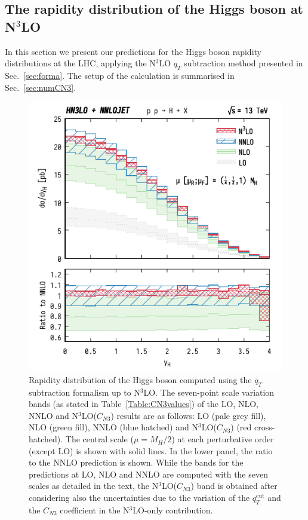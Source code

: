 \documentclass[12pt]{article}
\DeclareRobustCommand{\qt}{q_T}
\DeclareRobustCommand{\qtcut}{\ensuremath{q_T^\mathrm{cut}}}
\begin{document}
\subsection{The rapidity distribution of the Higgs boson at \texorpdfstring{N${}^\text{3}$LO}{N3LO}}
\label{sec:results}

In this section we present our predictions for the Higgs boson rapidity distributions at the LHC, applying the N$^{3}$LO $\qt$ subtraction method presented in Sec.~\ref{sec:forma}. The setup of the calculation is summarised in Sec.~\ref{sec:numCN3}. 

\begin{figure}[tbh]
\centering
\includegraphics[width=.6\linewidth]{./new_figures/yH_B02_best}
\caption{\label{fig:yHN3LO}{Rapidity distribution of the Higgs boson computed using the $\qt$ subtraction formalism up to N$^{3}$LO. The seven-point scale variation bands (as stated in Table~\ref{Table:CN3values}) of the LO, NLO, NNLO and N$^{3}$LO($C_{N3}$) results are as follows: LO (pale grey fill), NLO (green fill), NNLO (blue hatched) and N$^{3}$LO($C_{N3}$) (red cross-hatched). The central scale ($\mu=M_{H}/2$) at each perturbative order (except LO) is shown with solid lines. In the lower panel, the ratio to the NNLO prediction is shown. While the bands for the predictions at LO, NLO and NNLO are computed with the seven scales as detailed in the text, the N$^{3}$LO($C_{N3}$) band is obtained after considering also the uncertainties due to the variation of the $\qtcut$ and the $C_{N3}$ coefficient in the 
N$^{3}$LO-only contribution.
}}
\end{figure}
\end{document}
